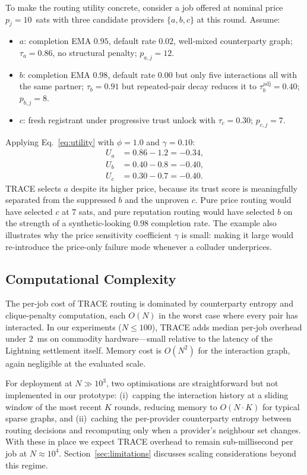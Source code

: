 \documentclass[sigconf,nonacm,10pt]{acmart}
\begin{document}
To make the routing utility concrete, consider a job offered at
nominal price $p_j = 10$~sats with three candidate providers
$\{a, b, c\}$ at this round. Assume:
\begin{itemize}[leftmargin=*,topsep=2pt,itemsep=1pt]
\item $a$: completion EMA $0.95$, default rate $0.02$, well-mixed
      counterparty graph; $\tau_a = 0.86$, no structural penalty;
      $p_{a,j} = 12$.
\item $b$: completion EMA $0.98$, default rate $0.00$ but only
      five interactions all with the same partner;
      $\tau_b = 0.91$ but repeated-pair decay reduces it to
      $\tau_b^{\text{adj}} = 0.40$; $p_{b,j} = 8$.
\item $c$: fresh registrant under progressive trust unlock with
      $\tau_c = 0.30$; $p_{c,j} = 7$.
\end{itemize}
Applying Eq.~\ref{eq:utility} with $\phi = 1.0$ and
$\gamma = 0.10$:
\begin{align*}
  U_a &= 0.86 - 1.2 = -0.34,\\
  U_b &= 0.40 - 0.8 = -0.40,\\
  U_c &= 0.30 - 0.7 = -0.40.
\end{align*}
TRACE selects $a$ despite its higher price, because its trust
score is meaningfully separated from the suppressed $b$ and the
unproven $c$. Pure price routing would have selected $c$ at $7$
sats, and pure reputation routing would have selected $b$ on the
strength of a synthetic-looking $0.98$ completion rate. The
example also illustrates why the price sensitivity coefficient
$\gamma$ is small: making it large would re-introduce the
price-only failure mode whenever a colluder underprices.

\subsection{Computational Complexity}

The per-job cost of TRACE routing is dominated by counterparty
entropy and clique-penalty computation, each $O(N)$ in the worst
case where every pair has interacted. In our experiments
($N \leq 100$), TRACE adds median per-job overhead under
$2$~ms on commodity hardware---small relative to the latency of
the Lightning settlement itself. Memory cost is $O(N^2)$ for the
interaction graph, again negligible at the evaluated scale.

For deployment at $N \gg 10^3$, two optimisations are
straightforward but not implemented in our prototype: (i)~capping
the interaction history at a sliding window of the most recent
$K$ rounds, reducing memory to $O(N \cdot K)$ for typical sparse
graphs, and (ii)~caching the per-provider counterparty entropy
between routing decisions and recomputing only when a provider's
neighbour set changes. With these in place we expect TRACE
overhead to remain sub-millisecond per job at $N \approx 10^4$.
Section~\ref{sec:limitations} discusses scaling considerations
beyond this regime.
\end{document}
